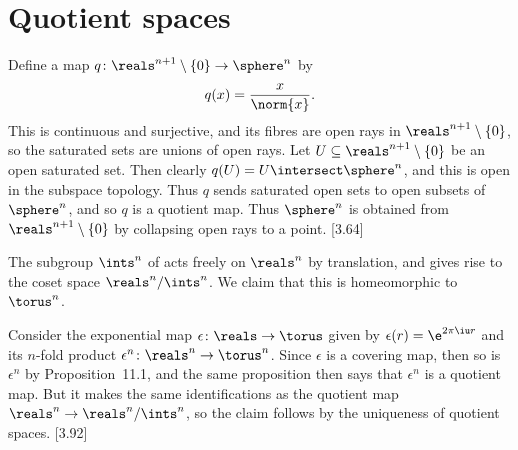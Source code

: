 \documentclass[article, a4paper, 11pt, oneside]{memoir}
\numberwithin{equation}{chapter}
\begin{document}
\chapter{Quotient spaces}

\begin{example}
    Define a map $q \colon \reals^{n+1} \setminus \{0\} \to \sphere^n$ by
    \begin{equation*}
        q(x)
            = \frac{x}{\norm{x}}.
    \end{equation*}
    This is continuous and surjective, and its fibres are open rays in $\reals^{n+1} \setminus \{0\}$, so the saturated sets are unions of open rays. Let $U \subseteq \reals^{n+1} \setminus \{0\}$ be an open saturated set. Then clearly $q(U) = U \intersect \sphere^n$, and this is open in the subspace topology. Thus $q$ sends saturated open sets to open subsets of $\sphere^n$, and so $q$ is a quotient map. Thus $\sphere^n$ is obtained from $\reals^{n+1} \setminus \{0\}$ by collapsing open rays to a point. [3.64]
\end{example}



\begin{example}
    \label{ex:torus-quotient-of-Rn}
    The subgroup $\ints^n$ of acts freely on $\reals^n$ by translation, and gives rise to the coset space $\reals^n/\ints^n$. We claim that this is homeomorphic to $\torus^n$.

    Consider the exponential map $\epsilon \colon \reals \to \torus$ given by $\epsilon(r) = \e^{2\pi \iu r}$ and its $n$-fold product $\epsilon^n \colon \reals^n \to \torus^n$. Since $\epsilon$ is a covering map, then so is $\epsilon^n$ by Proposition~11.1, and the same proposition then says that $\epsilon^n$ is a quotient map. But it makes the same identifications as the quotient map $\reals^n \to \reals^n/\ints^n$, so the claim follows by the uniqueness of quotient spaces. [3.92]
\end{example}
\end{document}
